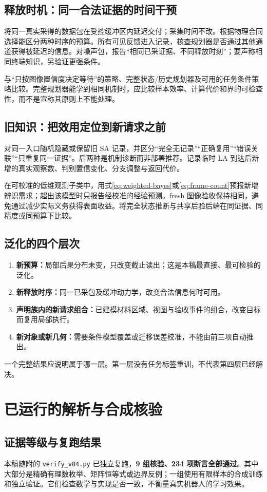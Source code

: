 \documentclass[11pt,a4paper,fontset=fandol]{ctexart}
\theoremstyle{definition}
\theoremstyle{remark}
\numberwithin{equation}{section}
\begin{document}
\subsection{释放时机：同一合法证据的时间干预}
将同一真实采得的数据包在受控缓冲区内延迟交付；采集时间不改。根据物理合同选择能区分两种时序的预算。所有可见反馈进入记录，核查规划器是否通过其他通道获得被延迟的信息。对噪声包，报告“相同已采证据、不同释放时刻”；要声称相同终端知识，另验证更强条件。

与“只按图像置信度决定等待”的策略、完整状态/历史规划器及可用的任务条件策略比较。完整规划器能学到相同机制时，应比较样本效率、计算代价和界的可检查性，而不是宣称其原则上不能处理。

\subsection{旧知识：把效用定位到新请求之前}
对同一入口随机隐藏或保留旧 SA 记录，并区分“完全无记录”“正确复用”“错误关联”“只重复同一证据”。后两种是机制诊断而非部署推荐。记录临时 LA 到达后新增的真实观察数、判别置信变化、分支调整与返回代价。

在可校准的低维观测子类中，用式\eqref{eq:weighted-bayes}或\eqref{eq:frame-count}预报新增辨识需求；超出该模型时只报告经校准的经验预测。fresh 图像验收保持相同，避免通过减少实际义务获得表面收益。将完全状态推断与共享后验后端在同证据、同精度或同预算下比较。

\subsection{泛化的四个层次}
\begin{enumerate}
\item \textbf{新预算：}局部后果分布未变，只改变截止读出；这是本稿最直接、最可检验的泛化。
\item \textbf{新释放时序：}同一已采包及缓冲动力学，改变合法信息何时可用。
\item \textbf{声明族内的新请求组合：}已建模材料区域、视图与验收事件的组合，改变目标而复用局部执行。
\item \textbf{新对象或新几何：}需要条件模型覆盖或迁移误差校准，不能由前三项自动推出。
\end{enumerate}
一个完整结果应说明属于哪一层。第一层没有任务标签重训，不代表第四层已经解决。

\section{已运行的解析与合成核验}
\label{sec:results}
\subsection{证据等级与复跑结果}
本稿随附的 \texttt{verify\_v84.py} 已独立复跑，\textbf{9 组核验、234 项断言全部通过}。其中大部分是精确有理数枚举、矩阵恒等式或边界反例；一组使用有限样本的合成训练和独立验证。它们检查数学与实现是否一致，不衡量真实机器人的学习效果。
\end{document}
